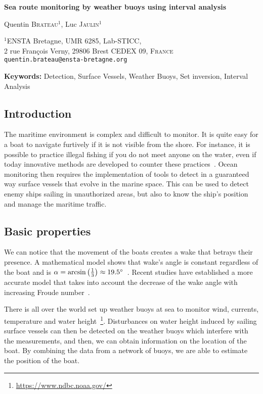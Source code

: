 \documentclass[14pt, a4paper]{article}
\begin{document}
	\begin{center}

		{\Large\bf Sea route monitoring by weather buoys using interval analysis}

		\vspace*{0.8cm}

		{\large Quentin \textsc{Brateau}$^{1}$, Luc \textsc{Jaulin}$^{1}$}

		\bigskip

		{\small $^{1}$ENSTA Bretagne, UMR 6285, Lab-STICC, \\
		2 rue François Verny, 29806 Brest CEDEX 09, \textsc{France} \\
		\texttt{quentin.brateau@ensta-bretagne.org}
		}

	\end{center}

	\bigskip

	{\noindent\bf Keywords:} Detection, Surface Vessels, Weather Buoys, Set inversion, Interval Analysis

	\subsection*{Introduction}
		The maritime environment is complex and difficult to monitor. It is quite easy for a boat to navigate furtively if it is not visible from the shore. For instance, it is possible to practice illegal fishing if you do not meet anyone on the water, even if today innovative methods are developed to counter these practices~\cite{doi:10.1073/pnas.1915499117}. Ocean monitoring then requires the implementation of tools to detect in a guaranteed way surface vessels that evolve in the marine space. This can be used to detect enemy ships sailing in unauthorized areas, but also to know the ship's position and manage the maritime traffic.

	\subsection*{Basic properties}
		We can notice that the movement of the boats creates a wake that betrays their presence. A mathematical model shows that wake's angle is constant regardless of the boat and is $\alpha = \arcsin\left(\frac{1}{3}\right) \approx 19.5 \degree$~\cite{thomson1887ship, stoker1992water}. Recent studies have established a more accurate model that takes into account the decrease of the wake angle with increasing Froude number~\cite{Rabaud_2013}.
		
		There is all over the world set up weather buoys at sea to monitor wind, currents, temperature and water height~\footnote{\url{https://www.ndbc.noaa.gov/}}. Disturbances on water height induced by sailing surface vessels can then be detected on the weather buoys which interfere with the measurements, and then, we can obtain information on the location of the boat. By combining the data from a network of buoys, we are able to estimate the position of the boat.
\end{document}
